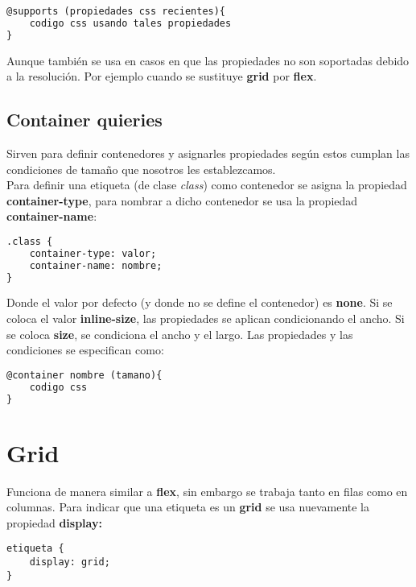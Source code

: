 \documentclass[10pt,oneside]{article}
\begin{document}
\begin{multicols}{2}
    \begin{lstlisting}[language=HTML]
@supports (propiedades css recientes){
    codigo css usando tales propiedades  
}
    \end{lstlisting}

    Aunque también se usa en casos en que las propiedades no son soportadas debido a la resolución. Por ejemplo cuando se sustituye \textbf{grid} por \textbf{flex}.

\subsection{Container quieries}

    Sirven para definir contenedores y asignarles propiedades según estos cumplan las condiciones de tamaño que nosotros les establezcamos. \\ \newline Para definir una etiqueta (de clase \textit{class}) como contenedor se asigna la propiedad \textbf{container-type}, para nombrar a dicho contenedor se usa la propiedad \textbf{container-name}:

    \begin{lstlisting}[language=HTML]
.class {
    container-type: valor;
    container-name: nombre;
}
    \end{lstlisting}
        
     Donde el valor por defecto (y donde no se define el contenedor) es \textbf{none}. Si se coloca el valor \textbf{inline-size}, las propiedades se aplican condicionando el ancho. Si se coloca \textbf{size}, se condiciona el ancho y el largo. Las propiedades y las condiciones se especifican como:

    \begin{lstlisting}[language=HTML]
@container nombre (tamano){
    codigo css
}
    \end{lstlisting}

\section{Grid}

    Funciona de manera similar a \textbf{flex}, sin embargo se trabaja tanto en filas como en columnas. Para indicar que una etiqueta es un \textbf{grid} se usa nuevamente la propiedad \textbf{display:}

    \begin{lstlisting}
etiqueta {
    display: grid;
}
    \end{lstlisting}


\end{multicols}
\end{document}
